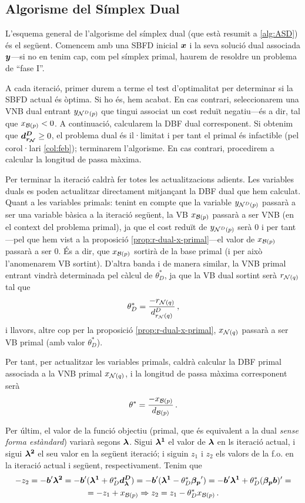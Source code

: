 \subsection{Algorisme del Símplex Dual}

L'esquema general de l'algorisme del símplex dual (que està resumit a 
\ref{alg:ASD}) és el 
següent. Comencem amb una SBFD inicial $\boldsymbol{x}$ i la seva solució dual 
associada $\boldsymbol{y}$---si no en tenim cap, com pel símplex primal, haurem de 
resoldre un problema de ``fase I''. 

A cada iteració, primer durem a terme el test d'optimalitat per determinar si 
la SBFD actual és òptima. Si ho és, hem acabat. En cas contrari, seleccionarem 
una VNB dual entrant ${y_{\mathcal{N}^D(p)}}$ que tingui associat un cost reduït 
negatiu---és a dir, tal que $x_{\mathcal{B}(p)} < 0$. A continuació, calcularem la DBF 
dual corresponent. Si obtenim que $\boldsymbol{d^D_{r_{\mathcal{N}}}} \ge 0$, el problema dual és 
il·limitat i per tant el primal és infactible (pel corol·lari \ref{col:feb}); 
terminarem l'algorisme. En cas contrari, procedirem a calcular la longitud de 
passa màxima.

Per terminar la iteració caldrà fer totes les actualitzacions adients. Les 
variables duals es poden actualitzar directament mitjançant la DBF dual que hem 
calculat. Quant a les variables primals: tenint 
en compte que la variable $y_{\mathcal{N}^D(p)}$ passarà a ser una variable 
bàsica a la iteració següent, la VB $x_{\mathcal{B}(p)}$ passarà a ser VNB (en el 
context del problema primal), ja que el 
cost reduït de $y_{\mathcal{N}^D(p)}$ serà 0 i per tant---pel que hem vist a la 
proposició \ref{prop:r-dual-x-primal}---el valor de $x_{\mathcal{B}(p)}$ passarà a ser 
0. És a dir, que $x_{\mathcal{B}(p)}$ sortirà de la base primal (i per això l'anomenarem 
VB sortint). D'altra banda i de manera similar, la VNB primal entrant vindrà
determinada pel càlcul 
de $\theta^\ast_D$, ja que la VB dual sortint serà $r_{\mathcal{N}(q)}$ tal que 
\[\theta_D^\ast = \frac{-r_{\mathcal{N}(q)}}{d^D_{r_{\mathcal{N}}(q)}}\,,\] i llavors, altre cop 
per 
la proposició \ref{prop:r-dual-x-primal}, $x_{\mathcal{N}(q)}$ passarà a ser VB primal 
(amb valor $\theta^\ast_D$).

Per tant, per actualitzar les variables primals, caldrà calcular la DBF primal 
associada a la VNB primal $x_{\mathcal{N}(q)}$, i la longitud de passa màxima 
corresponent serà
\[
	\theta^\ast = \frac{-x_{\mathcal{B}(p)}}{d_{\mathcal{B}(p)}}\,.
\] 

Per últim, el valor de la funció objectiu (primal, que és equivalent a la dual 
\textit{sense forma estàndard}) variarà segons $\boldsymbol{\lambda}$. 
Sigui $\boldsymbol{\lambda^1}$ el valor de $\boldsymbol{\lambda}$ en ls iteració actual, i 
sigui $\boldsymbol{\lambda^2}$ el seu valor en la següent iteració; i siguin $z_1$ i 
$z_2$ els valors de la f.o. en la iteració actual i següent, respectivament. 
Tenim que
\begin{multline*}
	-z_2 = -\boldsymbol{b}'\boldsymbol{\lambda^2} = -\boldsymbol{b}'(\boldsymbol{\lambda^1} + 
	\theta_D^*\boldsymbol{d^D_\lambda}) = -\boldsymbol{b}'(\boldsymbol{\lambda^1} - 
	\theta_D^*\boldsymbol{\beta_p}') = -\boldsymbol{b}'\boldsymbol{\lambda^1} + 
	\theta^*_D(\boldsymbol{\beta_p}\boldsymbol{b})' = \\
	= -z_1 + x_{\mathcal{B}(p)} \Rightarrow z_2 = z_1 - \theta_D^* x_{\mathcal{B}(p)}\,.
\end{multline*}

